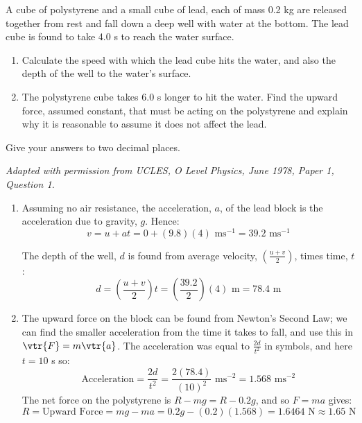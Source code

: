 
\begin{problem}[O1978PIIQ1a]
{A cube of polystyrene and a small cube of lead, each of mass 0.2 kg are released together from rest and fall down a deep well with water at the bottom. The lead cube is found to take 4.0 s to reach the water surface.
\begin{enumerate}
	\item Calculate the speed with which the lead cube hits the water, and also the depth of the well to the water's surface.
	\item The polystyrene cube takes 6.0 s longer to hit the water. Find the upward force, assumed constant, that must be acting on the polystyrene and explain why it is reasonable to assume it does not affect the lead.
\end{enumerate}
Give your answers to two decimal places.}  
{\textit{Adapted with permission from UCLES, O Level Physics, June 1978, Paper 1, Question 1.}}
{\begin{enumerate}
\item Assuming no air resistance, the acceleration, $a$, of the lead block is the acceleration due to gravity, $g$. Hence:
\begin{equation*}v = u + at = 0 + (9.8)(4) \textrm{ ms}^{-1} = 39.2 \textrm{ ms}^{-1} \end{equation*}

The depth of the well, $d$ is found from average velocity, $\left(\frac{u + v}{2}\right)$, times time, $t$:
\begin{equation*} d = \left(\frac{u + v}{2}\right)t = \left(\frac{39.2}{2}\right)(4) \textrm{ m} = 78.4 \textrm{ m} \end{equation*}
\item The upward force on the block can be found from Newton's Second Law; we can find the smaller acceleration from the time it takes to fall, and use this in $\vtr{F} = m\vtr{a}$. The acceleration was equal to $\frac{2d}{t^{2}}$ in symbols, and here $t = 10$ s so:
\begin{equation*} \textrm{Acceleration} = \frac{2d}{t^{2}} = \frac{2(78.4)}{(10)^{2}} \textrm{ ms}^{-2} = 1.568 \textrm{ ms}^{-2} \end{equation*}
The net force on the polystyrene is $R - mg = R - 0.2g$, and so $F = ma$ gives:
\begin{equation*} R = \textrm{Upward Force} = mg - ma = 0.2g - (0.2)(1.568) = 1.6464 \textrm{ N} \approx 1.65 \textrm{ N} \end{equation*}


\end{enumerate}}
\end{problem}
